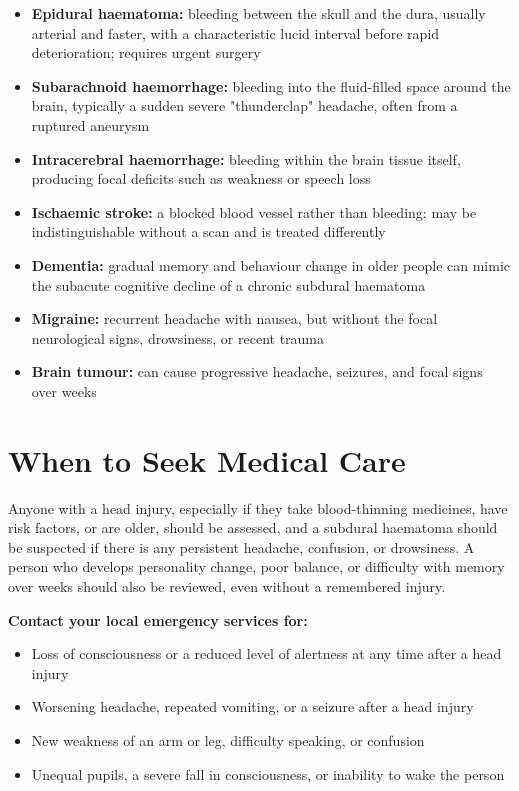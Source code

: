 \begin{itemize}
    \item \textbf{Epidural haematoma:} bleeding between the skull and the dura, usually arterial and faster, with a characteristic lucid interval before rapid deterioration; requires urgent surgery
    \item \textbf{Subarachnoid haemorrhage:} bleeding into the fluid-filled space around the brain, typically a sudden severe "thunderclap" headache, often from a ruptured aneurysm
    \item \textbf{Intracerebral haemorrhage:} bleeding within the brain tissue itself, producing focal deficits such as weakness or speech loss
    \item \textbf{Ischaemic stroke:} a blocked blood vessel rather than bleeding; may be indistinguishable without a scan and is treated differently
    \item \textbf{Dementia:} gradual memory and behaviour change in older people can mimic the subacute cognitive decline of a chronic subdural haematoma
    \item \textbf{Migraine:} recurrent headache with nausea, but without the focal neurological signs, drowsiness, or recent trauma
    \item \textbf{Brain tumour:} can cause progressive headache, seizures, and focal signs over weeks
\end{itemize}

\section*{When to Seek Medical Care}
Anyone with a head injury, especially if they take blood-thinning medicines, have risk factors, or are older, should be assessed, and a subdural haematoma should be suspected if there is any persistent headache, confusion, or drowsiness. A person who develops personality change, poor balance, or difficulty with memory over weeks should also be reviewed, even without a remembered injury.

\textbf{Contact your local emergency services for:}
\begin{itemize}
    \item Loss of consciousness or a reduced level of alertness at any time after a head injury
    \item Worsening headache, repeated vomiting, or a seizure after a head injury
    \item New weakness of an arm or leg, difficulty speaking, or confusion
    \item Unequal pupils, a severe fall in consciousness, or inability to wake the person
\end{itemize}

